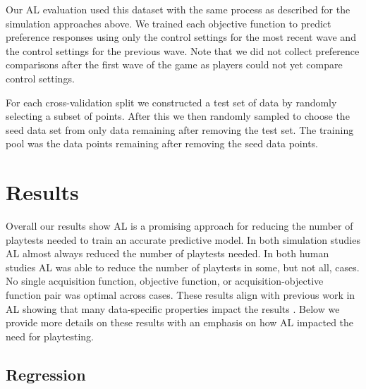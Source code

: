 \documentclass{sig-alternate}
\begin{document}

Our AL evaluation used this dataset with the same process as described for the simulation approaches above.
We trained each objective function to predict preference responses using only the control settings for the most recent wave and the control settings for the previous wave.
Note that we did not collect preference comparisons after the first wave of the game as players could not yet compare control settings.

For each cross-validation split we constructed a test set of data by randomly selecting a subset of points.
After this we then randomly sampled to choose the seed data set from only data remaining after removing the test set.
The training pool was the data points remaining after removing the seed data points.



\section{Results}

Overall our results show AL is a promising approach for reducing the number of playtests needed to train an accurate predictive model.
In both simulation studies AL almost always reduced the number of playtests needed. %
In both human studies AL was able to reduce the number of playtests in some, but not all, cases.
No single acquisition function, objective function, or acquisition-objective function pair was optimal across cases.
These results align with previous work in AL showing that many data-specific properties impact the results \cite{schein2007:al-logreg-eval}.
Below we provide more details on these results with an emphasis on how AL impacted the need for playtesting.


\subsection{Regression}
\end{document}
